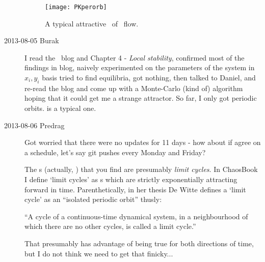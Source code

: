\begin{description}
\begin{figure}[ht]
\begin{center}
\texttt{[image: PKperorb]}
\end{center}
\caption{A typical
attractive \reqv\  of \twoMode\ flow.}
\label{fig:PKperorb}
\end{figure}

\item[2013-08-05  Burak] I read the \twoMode\ blog and
     {Chapter 4} -
    {\em Local stability}, confirmed most of the findings in blog,
    naively experimented on the parameters of the system in $x_i, y_i$
    basis tried to find equilibria, got nothing, then talked to Daniel,
    and re-read the blog and come up with a Monte-Carlo (kind of)
    algorithm hoping that it could get me a strange attractor. So far,
    I only got periodic orbits.  is a typical one.

\item[2013-08-06 Predrag]
Got worried that there were no updates for 11 days - how about if agree
on a schedule, let's say git pushes
\textcolor[rgb]{1.00,0.00,0.00}{every Monday and Friday}?

                                            \toCB
The \po s (actually, \reqva) that you find are presumably \emph{limit
cycles}. In ChaosBook I define `limit cycles' as \po s which are strictly
exponentially attracting forward in time. Parenthetically, in her thesis
De Witte defines a `limit cycle' as an ``isolated
periodic orbit'' thusly:

``A cycle of a continuous-time dynamical system, in a neighbourhood of
which there are no other cycles, is called a limit cycle.''

That presumably has advantage of being true for both directions of time,
but I do not think we need to get that finicky...



\end{description}
